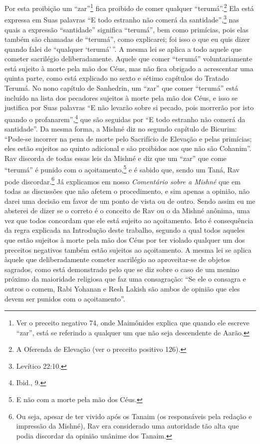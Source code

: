 Por esta proibição um ``zar''\footnote{Ver o preceito negativo 74, onde Maimônides explica que quando ele
  escreve ``zar'', está se referindo a qualquer um que não seja
  descendente de Aarão.} fica proibido de
comer qualquer ``terumá''.\footnote{A Oferenda de Elevação (ver o preceito positivo 126).} Ela está expressa em
Suas palavras ``E todo estranho não comerá
da santidade'',\footnote{Levítico 22:10.} nas quais a expressão ``santidade''
significa ``terumá'', bem como primícias, pois elas também são chamadas
de ``terumá'', como explicarei; foi isso o que eu quis dizer quando
falei de ``qualquer `terumá'\,''.
A mesma lei se aplica a todo aquele que cometer sacrilégio
deliberadamente.
Aquele que comer ``terumá'' voluntariamente está sujeito à morte
pela mão dos Céus, mas não fica obrigado a acrescentar uma quinta parte,
como está explicado no sexto e sétimo capítulos do Tratado Terumá. No
nono capítulo de Sanhedrin, um ``zar'' que comer ``terumá'' está incluído na
lista dos
pecadores sujeitos à morte pela mão dos Céus, e isso se justifica por
Suas palavras ``E não levarão sobre si pecado, pois morrerão por isto
quando o profanarem'',\footnote{Ibid., 9.} que são seguidas por ``E todo estranho
não comerá da santidade''. Da mesma forma, a Mishné diz no segundo
capítulo de Bicurim: ``Pode-se incorrer na pena de morte pelo Sacrifício de Elevação e pelas primícias; eles
estão sujeitos ao quinto adicional e são proibidos aos que não são
Cohanim''.
Rav discorda de todas essas leis da Mishné e diz que um ``zar'' que
come ``terumá'' é punido com o açoitamento,\footnote{E não com a morte pela mão dos Céus.} e é
sabido que, sendo um Taná, Rav pode discordar.\footnote{Ou seja, apesar de ter vivido após os Tanaim (os responsáveis pela
  redação e impressão da Mishné), Rav era considerado uma autoridade tão
  alta que podia discordar da opinião unânime dos Tanaim.} Já
explicamos em nosso \emph{Comentário sobre a Mishné} que em todas as
discussões que não afetem o procedimento, e sim apenas a opinião, não darei uma decisão em favor de um ponto de vista ou de
outro. Sendo assim eu me absterei de dizer se o correto é o conceito de
Rav ou o da Mishné anônima, uma vez que todos concordam que ele está
sujeito ao açoitamento. Isto é consequência da regra explicada na
Introdução deste trabalho, segundo a qual todos aqueles que estão
sujeitos à morte pela mão dos Céus por ter violado qualquer um dos
preceitos negativos também estão sujeitos ao açoitamento. A mesma lei se
aplica àquele que deliberadamente cometer sacrilégio ao aproveitar-se
de objetos sagrados, como está demonstrado pelo que se diz sobre o caso
de um menino próximo da maioridade religiosa que faz uma consagração:
``Se ele o consagra e outros o comem, Rabi Yohanan e Resh Lakish são
ambos de opinião que eles devem ser punidos com o açoitamento''.

